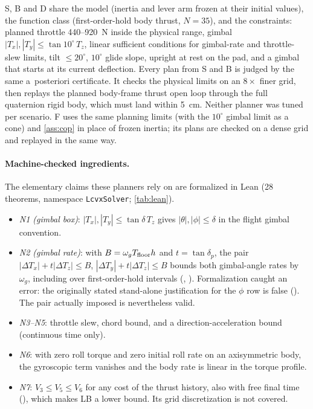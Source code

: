 S, B and D share the model (inertia and lever arm frozen at their initial values), the function class (first-order-hold body thrust, $N=35$), and the constraints: planned throttle
440--920~N inside the physical range, gimbal $|T_x|,|T_y|\le\tan10^\circ\,T_z$, linear sufficient conditions for gimbal-rate and
throttle-slew limits, tilt $\le20^\circ$, $10^\circ$ glide slope, upright at rest on the pad, and a gimbal that starts at its current
deflection. Every plan from S and B is judged by the same a~posteriori certificate. It checks the physical limits on an $8\times$
finer grid, then replays the planned body-frame thrust open loop through the full quaternion rigid body, which must land within
5~cm. Neither planner was tuned per scenario. F uses the same planning limits (with the $10^\circ$ gimbal limit as a cone) and
\cref{ass:cop} in place of frozen inertia; its plans are checked on a dense grid and replayed in the same way.

\paragraph{Machine-checked ingredients.}
The elementary claims these planners rely on are formalized in Lean (28 theorems, namespace \texttt{LcvxSolver}; \cref{tab:lean}).
\begin{itemize}[leftmargin=*,itemsep=1pt]
\item \emph{N1 (gimbal box)}: $|T_x|,|T_y|\le\tan\delta\,T_z$ gives $|\theta|,|\phi|\le\delta$ in the flight gimbal convention.
\item \emph{N2 (gimbal rate)}: with $B=\omega_g T_{\rm floor}h$ and $t=\tan\delta_p$, the pair $|\Delta T_x|+t|\Delta T_z|\le B$,
$|\Delta T_y|+t|\Delta T_z|\le B$ bounds both gimbal-angle rates by $\omega_g$, including over first-order-hold intervals
(, ). Formalization caught an error: the originally stated stand-alone
justification for the $\phi$ row is false (). The pair actually imposed is nevertheless valid.
\item \emph{N3--N5}: throttle slew, chord bound, and a direction-acceleration bound (continuous time only).
\item \emph{N6}: with zero roll torque and zero initial roll rate on an axisymmetric body, the gyroscopic term vanishes and the body
rate is linear in the torque profile.
\item \emph{N7}: $V_3\le V_5\le V_6$ for any cost of the thrust history, also with free final time (),
which makes LB a lower bound. Its grid discretization is not covered.
\end{itemize}

